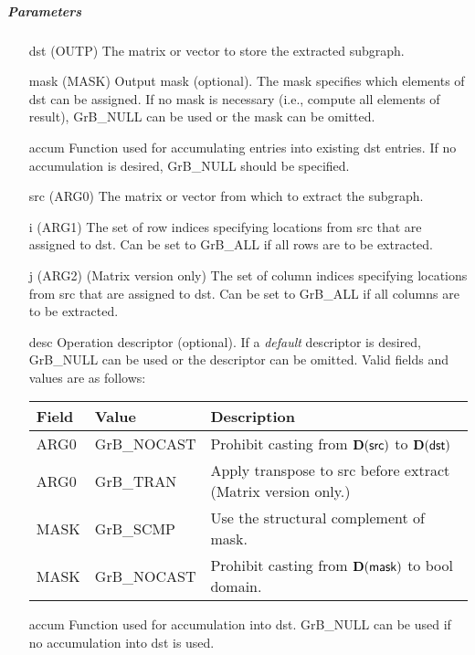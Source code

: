 \subparagraph{Parameters}

\begin{itemize}[leftmargin=1in]
    \item[{\sf dst}]   ({\sf OUTP}) The matrix or vector to store the extracted subgraph.
    \item[{\sf mask}]  ({\sf MASK}) Output mask (optional). The mask
    specifies which elements of {\sf dst} can be assigned.
    If no mask is necessary (i.e., compute all elements of result),
    {\sf GrB\_NULL} can be used or the mask can be omitted.
    \item[{\sf accum}]  Function used for accumulating entries into existing {\sf dst} entries. 
			If no accumulation is desired, {\sf GrB\_NULL} should be specified.
    \item[{\sf src}]   ({\sf ARG0}) The matrix or vector from which to extract the subgraph.
    \item[{\sf i}]     ({\sf ARG1}) The set of row indices specifying locations from src that
                              are assigned to dst. Can
                              be set to {\sf GrB\_ALL} if all rows are
                              to be extracted.
    \item[{\sf j}]     ({\sf ARG2}) (Matrix version only) The set of column indices specifying
                              locations from src that are assigned to dst. Can
                              be set to {\sf GrB\_ALL} if all columns are
                              to be extracted.


    \item[{\sf desc}]   Operation descriptor (optional). If a
    \emph{default} descriptor is desired, {\sf GrB\_NULL} can be
    used or the descriptor can be omitted.  Valid fields and values are as follows: \\
    \begin{tabular}{lll}
    Field  & Value & Description \\
    \hline
    {\sf ARG0} & {\sf GrB\_NOCAST} & Prohibit casting from $\bold{D}({\sf src})$ to $\bold{D}({\sf dst})$ \\
    {\sf ARG0} & {\sf GrB\_TRAN}   & Apply transpose to {\sf src} before extract (Matrix version only.) \\
    {\sf MASK} & {\sf GrB\_SCMP}   & Use the structural complement of {\sf mask}. \\
    {\sf MASK} & {\sf GrB\_NOCAST} & Prohibit casting from $\bold{D}({\sf mask})$ to {\sf bool} domain. \\
    \end{tabular}

    \item[{\sf accum}] Function used for accumulation into dst.  {\sf GrB\_NULL}
                       can be used if no accumulation into dst is used.
\end{itemize}

